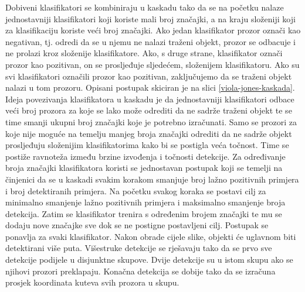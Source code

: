 Dobiveni klasifikatori se kombiniraju u kaskadu tako da se na početku nalaze jednostavniji klasifikatori koji koriste mali broj značajki, a na kraju složeniji koji za klasifikaciju koriste veći broj značajki. Ako jedan klasifikator prozor označi kao negativan, tj. odredi da se u njemu ne nalazi traženi objekt, prozor se odbacuje i ne prolazi kroz složenije klasifikatore. Ako, s druge strane, klasifikator označi prozor kao pozitivan, on se prosljeđuje sljedećem, složenijem klasifikatoru. Ako su svi klasifikatori označili prozor kao pozitivan, zaključujemo da se traženi objekt nalazi u tom prozoru. Opisani postupak skiciran je na slici \ref{viola-jones-kaskada}. Ideja povezivanja klasifikatora u kaskadu je da jednostavniji klasifikatori odbace veći broj prozora za koje se lako može odrediti da ne sadrže traženi objekt te se time smanji ukupni broj značajki koje je potrebno izračunati. Samo se prozori za koje nije moguće na temelju manjeg broja značajki odrediti da ne sadrže objekt prosljeđuju složenijim klasifikatorima kako bi se postigla veća točnost. Time se postiže ravnoteža između brzine izvođenja i točnosti detekcije.
Za određivanje broja značajki klasifikatora koristi se jednostavan postupak koji se temelji na činjenici da se u kaskadi svakim korakom smanjuje broj lažno pozitivnih primjera i broj detektiranih primjera. Na početku svakog koraka se postavi cilj za minimalno smanjenje lažno pozitivnih primjera i maksimalno smanjenje broja detekcija. Zatim se klasifikator trenira s određenim brojem značajki te mu se dodaju nove značajke sve dok se ne postigne postavljeni cilj. Postupak se ponavlja za svaki klasifikator.
Nakon obrade cijele slike, objekti će uglavnom biti detektirani više puta. Višestruke detekcije se rješavaju tako da se prvo sve detekcije podijele u disjunktne skupove. Dvije detekcije su u istom skupu ako se njihovi prozori preklapaju. Konačna detekcija se dobije tako da se izračuna prosjek koordinata kuteva svih prozora u skupu.

